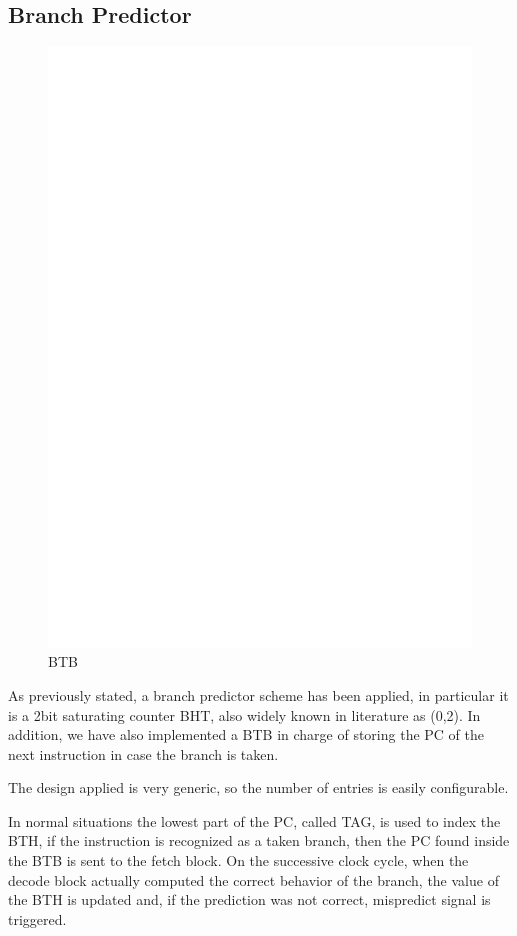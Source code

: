 \documentclass[12pt]{article}
\begin{document}
\subsection{Branch Predictor}
\begin{figure}[h!]
	\includegraphics[width=\textwidth, center]{images/BTB.eps}
	\caption{BTB}
	\label{Branch Predictor Block Schematic}
\end{figure}
As previously stated, a branch predictor scheme has been applied, in particular it is a 2bit saturating counter BHT, also widely known in literature as (0,2). In addition, we have also implemented a BTB in charge of storing the PC of the next instruction in case the branch is taken.

The design applied is very generic, so the number of entries is easily configurable.

In normal situations the lowest part of the PC, called TAG, is used to index the BTH, if the instruction is recognized as a taken branch, then the PC found inside the BTB is sent to the fetch block. On the successive clock cycle, when the decode block actually computed the correct behavior of the branch, the value of the BTH is updated and, if the prediction was not correct, mispredict signal is triggered.
\end{document}
